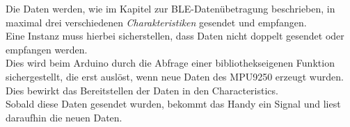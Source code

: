 Die Daten werden, wie im Kapitel zur BLE-Datenübetragung beschrieben, in maximal
drei verschiedenen \textit{Charakteristiken} gesendet und empfangen. \\
Eine Instanz muss hierbei sicherstellen, dass Daten
nicht doppelt gesendet oder empfangen werden.\\
Dies wird beim Arduino durch die Abfrage einer bibliothekseigenen Funktion
sichergestellt, die erst auslöst, wenn neue Daten des MPU9250 erzeugt wurden. Dies bewirkt
das Bereitstellen der Daten in den Characteristics.\\
Sobald diese Daten gesendet wurden, bekommt das Handy ein Signal und liest
daraufhin die neuen Daten.
